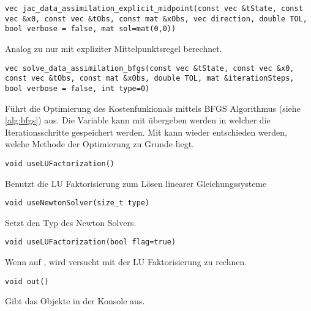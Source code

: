 \begin{lstlisting}[numbers=none]
vec jac_data_assimilation_explicit_midpoint(const vec &tState, const vec &x0, const vec &tObs, const mat &xObs, vec direction, double TOL, bool verbose = false, mat sol=mat(0,0))
\end{lstlisting}
Analog zu  nur mit expliziter Mittelpunktsregel berechnet.
\begin{lstlisting}[numbers=none]
vec solve_data_assimilation_bfgs(const vec &tState, const vec &x0, const vec &tObs, const mat &xObs, double TOL, mat &iterationSteps, bool verbose = false, int type=0)
\end{lstlisting}
Führt die Optimierung des Kostenfunkionals mittels BFGS Algorithmus (siehe \ref{alg:bfgs}) aus. Die Variable  kann mit übergeben werden in welcher die Iterationsschritte gespeichert werden. Mit  kann wieder entschieden werden, welche Methode der Optimierung zu Grunde liegt.
\begin{lstlisting}[numbers=none]
void useLUFactorization()
\end{lstlisting}
Benutzt die LU Faktorisierung zum Lösen linearer Gleichungssysteme
\begin{lstlisting}[numbers=none]
void useNewtonSolver(size_t type)
\end{lstlisting}
Setzt den Typ des Newton Solvers.
\begin{lstlisting}[numbers=none]
void useLUFactorization(bool flag=true)
\end{lstlisting}
Wenn auf , wird versucht mit der LU Faktorisierung zu rechnen. 
\begin{lstlisting}[numbers=none]
void out()
\end{lstlisting}
Gibt das  Objekte in der Konsole aus.
